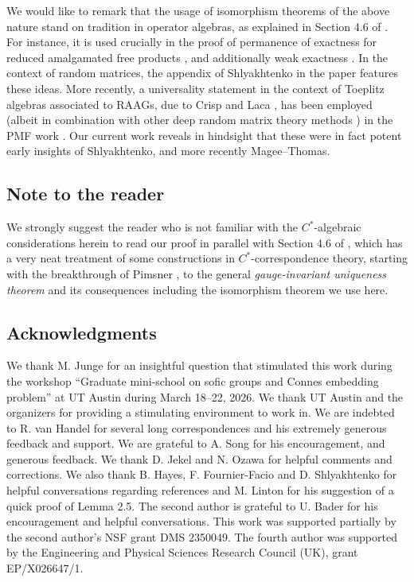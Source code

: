 \documentclass[10pt]{amsart}
\theoremstyle{definition}
\begin{document}
We would like to remark that the usage of isomorphism theorems of the above nature stand on tradition in operator algebras, as explained in Section 4.6 of \cite{brown2008textrm}.  For instance, it is used crucially in the proof of permanence of exactness for reduced amalgamated free products \cite{dykema2001exactness}, and additionally weak exactness \cite{toyosawa2025weak}. In the context of random matrices, the appendix of Shlyakhtenko in the paper \cite{male2011norm} features these ideas. More recently, a universality statement in the context of Toeplitz algebras associated to RAAGs, due to Crisp and Laca \cite{crisp2002toeplitz}, has been employed (albeit in combination with other deep random matrix theory methods \cite{Collins2022OnTO}) in the PMF work \cite{magee2025strong}. Our current work reveals in hindsight that these were in fact potent early insights of Shlyakhtenko, and more recently Magee--Thomas.  

\subsection*{Note to the reader} We strongly suggest the reader who is not familiar with the $C^*$-algebraic considerations herein to read our proof in parallel with Section 4.6 of \cite{brown2008textrm}, which has a very neat treatment of some constructions in $C^*$-correspondence theory, starting with the breakthrough of Pimsner \cite{pimsner1997class}, to the general \emph{gauge-invariant uniqueness theorem} \cite{FowlerMuhlyRaeburn2003} and its consequences including the isomorphism theorem we use here. 
 



\subsection{Acknowledgments} 
We thank M. Junge for an insightful question that stimulated this work during the workshop ``Graduate mini-school on sofic groups and Connes embedding problem'' at UT Austin during March 18--22, 2026. We thank UT Austin and the organizers for providing a stimulating environment to work in. We are indebted to R. van Handel for several long correspondences and his extremely generous feedback and support. We are grateful to A. Song for his encouragement, and generous feedback.  We thank D. Jekel and N. Ozawa for helpful comments and corrections. We also thank B. Hayes, F. Fournier-Facio and D. Shlyakhtenko for helpful conversations regarding references and M. Linton for his suggestion of a quick proof of Lemma 2.5. The second author is grateful to U. Bader for his encouragement and helpful conversations. This work was supported partially by the second author's NSF grant DMS 2350049. The fourth author was supported by the Engineering and Physical Sciences Research Council (UK), grant EP/X026647/1. 
\end{document}
